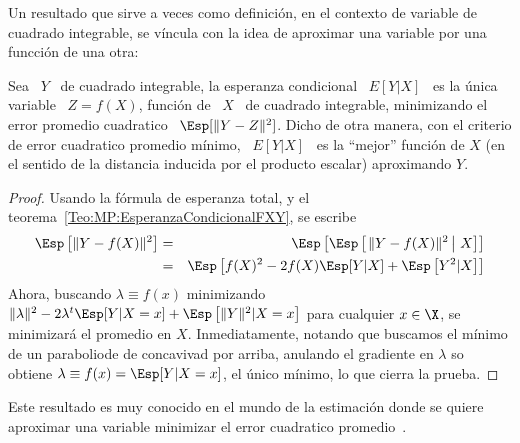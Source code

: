 Un resultado  que  sirve a  veces  como definici\'on,  en  el contexto  de
variable  de  cuadrado integrable,  se  v\'incula con  la  idea  de aproximar  una
variable por una funcci\'on de una otra:
%
\begin{teorema}
  Sea \ $Y$  \ de cuadrado integrable, la esperanza condicional  \ $E[Y|X]$ \ es
  la \'unica variable \ $Z = f(X)$, funci\'on de \ $X$ \ de cuadrado integrable,
  minimizando el error promedio cuadratico \ $\Esp[  \| Y - Z \|^2 ]$.  Dicho de
  otra manera, con el criterio de error cuadratico promedio m\'inimo, \ $E[Y|X]$
  \ es la ``mejor''  funci\'on de $X$ (en el sentido de la distancia inducida por
  el producto escalar) aproximando $Y$.
\end{teorema}
\begin{proof}
  Usando      la      f\'ormula      de      esperanza     total,      y      el
  teorema~\ref{Teo:MP:EsperanzaCondicionalFXY}, se escribe
%
\begin{eqnarray*}
\Esp\left[ \| Y - f(X) \|^2 \right] & = & \Esp\left[ \Esp\left[ \left. \| Y -
f(X) \|^2 \, \right| \, X \right] \right]\\
%
& = & \Esp\left[ f(X)^2 - 2 f(X) \Esp[Y|X] +  \Esp\left[ Y^2 | X \right] \right]
\end{eqnarray*}
%
Ahora, buscando $\lambda \equiv f(x)$  minimizando $\| \lambda\|^2 - 2 \lambda^t
\Esp[Y|X=x] + \Esp\left[ \| Y \|^2 |  X=x \right]$ para cualquier $x \in \X$, se
minimizar\'a  el  promedio en  $X$.   Inmediatamente,  notando  que buscamos  el
m\'inimo de  un paraboliode de concavivad  por arriba, anulando  el gradiente en
$\lambda$ so obtiene  $\lambda \equiv f(x) = \Esp[Y|X=x]$,  el \'unico m\'inimo,
lo que cierra la prueba.
\end{proof}
%
Este resultado  es muy conocido en el  mundo de la estimaci\'on  donde se quiere
aproximar una variable minimizar el error cuadratico promedio~\cite{Kay93, Rob07}.

